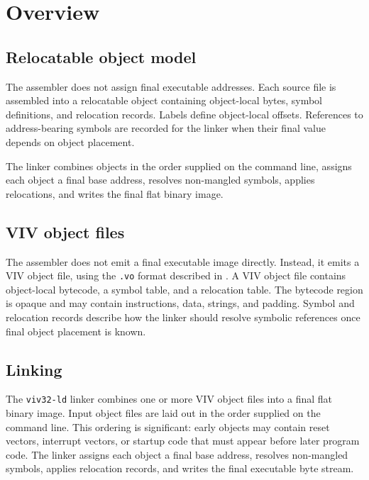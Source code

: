 \section{Overview}
\subsection{Relocatable object model}

The assembler does not assign final executable addresses. Each source file is assembled
into a relocatable object containing object-local bytes, symbol definitions, and
relocation records. Labels define object-local offsets. References to address-bearing
symbols are recorded for the linker when their final value depends on object placement.

The linker combines objects in the order supplied on the command line, assigns each
object a final base address, resolves non-mangled symbols, applies relocations, and
writes the final flat binary image.

\subsection{VIV object files}

The assembler does not emit a final executable image directly. Instead, it emits a
VIV object file, using the \texttt{.vo} format described in
. A VIV object file contains object-local bytecode,
a symbol table, and a relocation table. The bytecode region is opaque and may contain
instructions, data, strings, and padding. Symbol and relocation records describe how
the linker should resolve symbolic references once final object placement is known.

\subsection{Linking}

The \texttt{viv32-ld} linker combines one or more VIV object files into a final flat
binary image. Input object files are laid out in the order supplied on the command
line. This ordering is significant: early objects may contain reset vectors,
interrupt vectors, or startup code that must appear before later program code. The
linker assigns each object a final base address, resolves non-mangled symbols, applies
relocation records, and writes the final executable byte stream.
